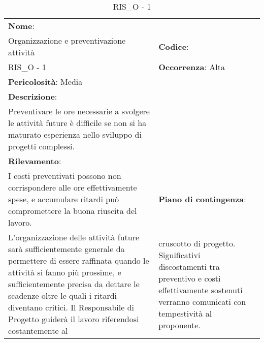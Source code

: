 \renewcommand{\arraystretch}{1.5}
\begin{longtable} { 
		>{\raggedright}p{} 
		>{\raggedright}p{} 
		>{\raggedright}p{}    }
	
	\caption{RIS\_O - 1} \endhead	
	
	
	\textbf{Nome}: \\ Organizzazione e preventivazione attività
	& \textbf{Codice}: \\ RIS\_O - 1
	& \textbf{Occorrenza}: Alta \\ \textbf{Pericolosità}: Media
	
	\tabularnewline
	
	\textbf{Descrizione}: \\ Preventivare le ore necessarie a svolgere le attività future è difficile se non si ha maturato esperienza nello sviluppo di progetti complessi. \\
	\textbf{Rilevamento}: \\ I costi preventivati possono non corrispondere alle ore effettivamente spese, e accumulare ritardi può compromettere la buona riuscita del lavoro.
	& 
	\textbf{Piano di contingenza}: \\ L'organizzazione delle attività future sarà sufficientemente generale da permettere di essere raffinata quando le attività si fanno più prossime, e sufficientemente precisa da dettare le scadenze oltre le quali i ritardi diventano critici. Il Responsabile di Progetto guiderà il lavoro riferendosi costantemente al 
	&  
	cruscotto di progetto. Significativi discostamenti tra preventivo e costi effettivamente sostenuti verranno comunicati con tempestività al proponente.
	
\end{longtable}



